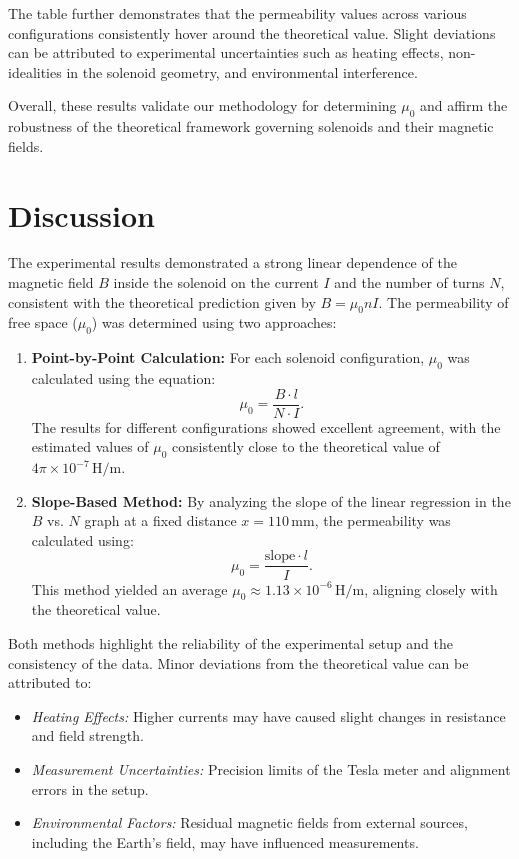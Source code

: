 \documentclass[journal]{IEEEtran}
\begin{document}
    The table further demonstrates that the permeability values across various configurations consistently hover around the theoretical value. Slight deviations can be attributed to experimental uncertainties such as heating effects, non-idealities in the solenoid geometry, and environmental interference.
    
    Overall, these results validate our methodology for determining \( \mu_0 \) and affirm the robustness of the theoretical framework governing solenoids and their magnetic fields.
    
    

    \section{Discussion}
    The experimental results demonstrated a strong linear dependence of the magnetic field \( B \) inside the solenoid on the current \( I \) and the number of turns \( N \), consistent with the theoretical prediction given by \( B = \mu_0 n I \). The permeability of free space (\( \mu_0 \)) was determined using two approaches:
    
    \begin{enumerate}
        \item \textbf{Point-by-Point Calculation:} For each solenoid configuration, \( \mu_0 \) was calculated using the equation:
        \[
        \mu_0 = \frac{B \cdot l}{N \cdot I}.
        \]
        The results for different configurations showed excellent agreement, with the estimated values of \( \mu_0 \) consistently close to the theoretical value of \( 4\pi \times 10^{-7} \, \mathrm{H/m} \).
    
        \item \textbf{Slope-Based Method:} By analyzing the slope of the linear regression in the \( B \) vs. \( N \) graph at a fixed distance \( x = 110 \, \text{mm} \), the permeability was calculated using:
        \[
        \mu_0 = \frac{\text{slope} \cdot l}{I}.
        \]
        This method yielded an average \( \mu_0 \approx 1.13 \times 10^{-6} \, \mathrm{H/m} \), aligning closely with the theoretical value.
    \end{enumerate}
    
    Both methods highlight the reliability of the experimental setup and the consistency of the data. Minor deviations from the theoretical value can be attributed to:
    \begin{itemize}
        \item \textit{Heating Effects:} Higher currents may have caused slight changes in resistance and field strength.
        \item \textit{Measurement Uncertainties:} Precision limits of the Tesla meter and alignment errors in the setup.
        \item \textit{Environmental Factors:} Residual magnetic fields from external sources, including the Earth's field, may have influenced measurements.
    \end{itemize}
    
\end{document}
